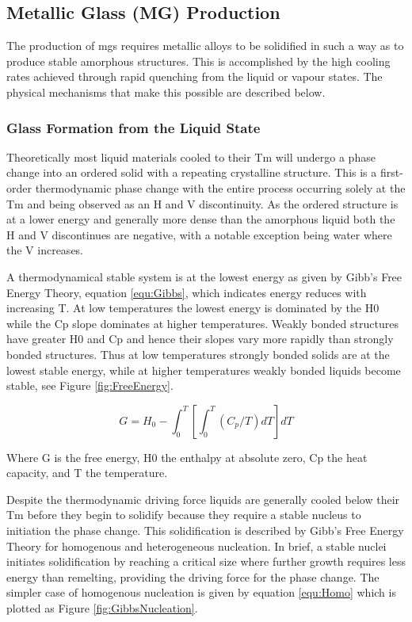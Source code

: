 \documentclass[a4paper,12pt,oneside]{report}%
\begin{document}
\subsection{Metallic Glass (MG) Production}
The production of \glspl{mg} requires metallic alloys to be solidified in such a way as to produce stable amorphous structures. This is accomplished by the high cooling rates achieved through rapid quenching from the liquid or vapour states. The physical mechanisms that make this possible are described below. 

\subsubsection{Glass Formation from the Liquid State} \label{sec:Gibbs}
Theoretically most liquid materials cooled to their \gls{Tm} will undergo a phase change into an ordered solid with a repeating crystalline structure. This is a first-order thermodynamic phase change with the entire process occurring solely at the \gls{Tm} and being observed as an \gls{H} and \gls{V} discontinuity. As the ordered structure is at a lower energy and generally more dense than the amorphous liquid both the \gls{H} and \gls{V} discontinues are negative, with a notable exception being water where the \gls{V} increases.
 
A thermodynamical stable system is at the lowest energy as given by Gibb's Free Energy Theory, equation \ref{equ:Gibbs}, which indicates energy reduces with increasing \gls{T}. At low temperatures the lowest energy is dominated by the \gls{H0} while the \gls{Cp} slope dominates at higher temperatures. Weakly bonded structures have greater \gls{H0} and \gls{Cp} and hence their slopes vary more rapidly than strongly bonded structures. Thus at low temperatures strongly bonded solids are at the lowest stable energy, while at higher temperatures weakly bonded liquids become stable, see Figure \ref{fig:FreeEnergy}. 

\begin{equation}
	G = H_{0}-\int_{0}^{T} 
	\left[
	\int_{0}^{T}(C_{p}/T) dT
	\right] dT
	\label{equ:Gibbs}
\end{equation}

Where \acrshort{G} is the free energy, \acrshort{H0} the enthalpy at absolute zero, \acrshort{Cp} the heat capacity, and \acrshort{T} the temperature. 

Despite the thermodynamic driving force liquids are generally cooled below their \gls{Tm} before they begin to solidify because they require a stable nucleus to initiation the phase change. This solidification is described by Gibb's Free Energy Theory for homogenous and heterogeneous nucleation. In brief, a stable nuclei initiates solidification by reaching a critical size where further growth requires less energy than remelting, providing the driving force for the phase change. The simpler case of homogenous nucleation is given by equation \ref{equ:Homo} which is plotted as Figure \ref{fig:GibbsNucleation}. 
\end{document}
